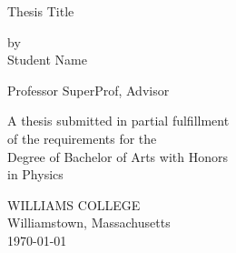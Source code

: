 \documentclass[12pt, oneside]{book}
\begin{document}
\begin{titlepage}
\begin{center}

\vspace*{2cm}

{\huge Thesis Title} %

\vspace{2cm}

{\large by\\Student Name}

\vspace{2cm}
{Professor SuperProf, Advisor}

\vfill

A thesis submitted in partial fulfillment\\
of the requirements for the\\
Degree of Bachelor of Arts with Honors\\
in Physics

\vspace*{3cm}

WILLIAMS COLLEGE\\
Williamstown, Massachusetts\\
\today %
\end{center}
\end{titlepage}

\frontmatter


\end{document}
